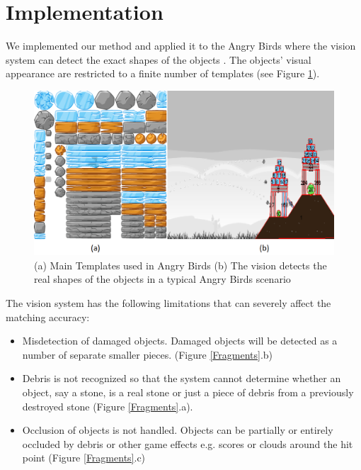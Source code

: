 \documentclass[letterpaper]{article}
\begin{document}
\section{Implementation}
We implemented our method and applied it to the Angry Birds where the vision system can detect the exact shapes of the objects \cite{andrewwang}. The objects' visual appearance are restricted to a finite number of templates (see Figure \ref{Templates}).  
\begin{figure}[h!]
\centering\includegraphics[scale=0.28]{Templates.png}\caption{(a) Main Templates used in Angry Birds (b) The vision detects the real shapes of the objects in a typical Angry Birds scenario}
\label{Templates}
\end{figure}
The vision system has the following limitations that can severely affect the matching accuracy: 
\begin{itemize}
\item Misdetection of damaged objects. Damaged objects will be detected as a number of separate smaller pieces. (Figure \ref{Fragments}.b) 
\item Debris is not recognized so that the system cannot determine whether an object, say a stone, is a real stone or just a piece of debris from a previously destroyed stone (Figure \ref{Fragments}.a).
\item Occlusion of objects is not handled. Objects can be partially or entirely occluded by debris or other game effects e.g. scores or clouds around the hit point (Figure \ref{Fragments}.c)
\end{itemize}
\end{document}
